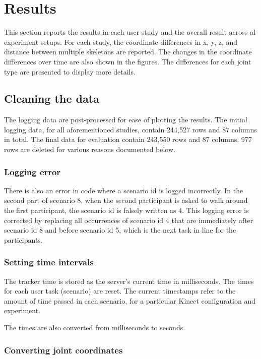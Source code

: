 \section{Results}
\label{sec:results}

This section reports the results in each user study and the overall result across al experiment setups. For each study, the coordinate differences in x, y, z, and distance between multiple skeletons are reported. The changes in the coordinate differences over time are also shown in the figures. The differences for each joint type are presented to display more details.

\subsection{Cleaning the data}

The logging data are post-processed for ease of plotting the results. The initial logging data, for all aforementioned studies, contain 244,527 rows and 87 columns in total. The final data for evaluation contain 243,550 rows and 87 columns. 977 rows are deleted for various reasons documented below.

\subsubsection{Logging error}
There is also an error in code where a scenario id is logged incorrectly. In the second part of scenario 8, when the second participant is asked to walk around the first participant, the scenario id is falsely written as 4. This logging error is corrected by replacing all occurrences of scenario id 4 that are immediately after scenario id 8 and before scenario id 5, which is the next task in line for the participants.

\subsubsection{Setting time intervals}
The tracker time is stored as the server's current time in milliseconds. The times for each user task (scenario) are reset. The current timestamps refer to the amount of time passed in each scenario, for a particular Kinect configuration and experiment.

The times are also converted from milliseconds to seconds.

\subsubsection{Converting joint coordinates}

